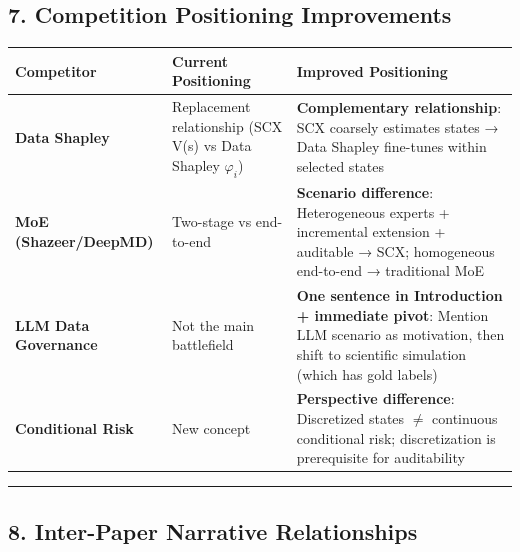 \documentclass[
  12pt,
]{article}
\begin{document}
\subsection{7. Competition Positioning Improvements}\label{competition-positioning-improvements}

\begin{longtable}[]{@{}
  >{\raggedright\arraybackslash}p{}
  >{\raggedright\arraybackslash}p{}
  >{\raggedright\arraybackslash}p{}@{}}
\toprule\noalign{}
\begin{minipage}[b]{\linewidth}\raggedright
Competitor
\end{minipage} & \begin{minipage}[b]{\linewidth}\raggedright
Current Positioning
\end{minipage} & \begin{minipage}[b]{\linewidth}\raggedright
Improved Positioning
\end{minipage} \\
\midrule\noalign{}
\endhead
\bottomrule\noalign{}
\endlastfoot
\textbf{Data Shapley} & Replacement relationship (SCX V(s) vs Data Shapley $\varphi_i$) & \textbf{Complementary relationship}: SCX coarsely estimates states → Data Shapley fine-tunes within selected states \\
\textbf{MoE (Shazeer/DeepMD)} & Two-stage vs end-to-end & \textbf{Scenario difference}: Heterogeneous experts + incremental extension + auditable → SCX; homogeneous end-to-end → traditional MoE \\
\textbf{LLM Data Governance} & Not the main battlefield & \textbf{One sentence in Introduction + immediate pivot}: Mention LLM scenario as motivation, then shift to scientific simulation (which has gold labels) \\
\textbf{Conditional Risk} & New concept & \textbf{Perspective difference}: Discretized states $\neq$ continuous conditional risk; discretization is prerequisite for auditability \\
\end{longtable}

\begin{center}\rule{0.5\linewidth}{0.5pt}\end{center}

\subsection{8. Inter-Paper Narrative Relationships}\label{inter-paper-narrative-relationships}
\end{document}
